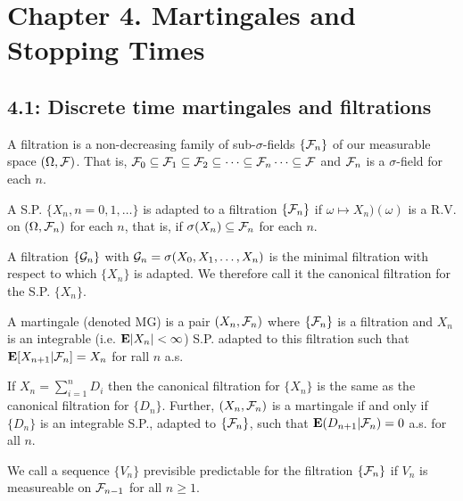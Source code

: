 \section*{Chapter 4. Martingales and Stopping Times}
\subsection*{4.1: Discrete time martingales and filtrations}
\begin{definition*} 
A filtration is a non-decreasing family of sub-$\sigma$-fields $\{\mathcal{F}_n\}$ of our
measurable space $(\Omega, \mathcal{F})$. That is, $\mathcal{F}_0 \subseteq \mathcal{F}_1 \subseteq \mathcal{F}_2
\subseteq \cdots \subseteq \mathcal{F}_n \cdots \subseteq \mathcal{F}$ and $\mathcal{F}_n$ is a
$\sigma$-field for each $n$.
\end{definition*} 

\begin{definition*} 
A S.P. $\{X_n, n = 0, 1, \dots\}$ is adapted to a filtration $\{\mathcal{F}_n\}$ if
$\omega \mapsto X_n)(\omega)$ is a R.V. on $(\Omega, \mathcal{F}_n)$ for each $n$, that
is, if $\sigma(X_n) \subseteq \mathcal{F}_n$ for each $n$.
\end{definition*} 

\begin{definition*} 
A filtration $\{\mathcal{G}_n\}$ with $\mathcal{G}_n = \sigma(X_0, X_1, \dots, X_n)$ is the
minimal filtration with respect to which $\{X_n\}$ is adapted. We therefore call
it the canonical filtration for the S.P. $\{X_n\}$.
\end{definition*} 

\begin{definition*} 
A martingale (denoted MG) is a pair $(X_n, \mathcal{F}_n)$ where $\{\mathcal{F}_n\}$ is a
filtration and $X_n$ is an integrable (i.e. $\mathbf{E}|X_n| < \infty$) S.P. adapted to
this filtration such that $\mathbf{E}[X_{n+1} | \mathcal{F}_n] = X_n$ for rall $n$ a.s.
\end{definition*}

\begin{proposition*} 
If $X_n = \sum_{i=1}^n D_i$ then the canonical filtration for $\{X_n\}$ is the
same as the canonical filtration for $\{D_n\}$. Further, $(X_n, \mathcal{F}_n)$ is a
martingale if and only if $\{D_n\}$ is an integrable S.P., adapted to
$\{\mathcal{F}_n\}$, such that $\mathbf{E}(D_{n+1} | \mathcal{F}_n) = 0$ a.s. for all $n$.
\end{proposition*} 

\begin{definition*} 
We call a sequence $\{V_n\}$ previsible predictable for the filtration
$\{\mathcal{F}_n\}$ if $V_n$ is measureable on $\mathcal{F}_{n-1}$ for all $n \ge 1$.
\end{definition*} 

